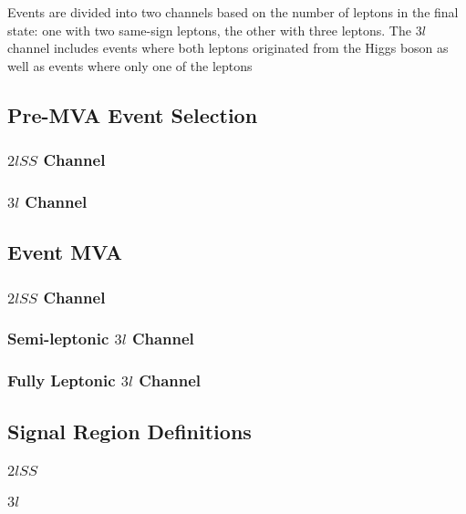 Events are divided into two channels based on the number of leptons in the final state: one with two same-sign leptons, the other with three leptons. The $3l$ channel includes events where both leptons originated from the Higgs boson as well as events where only one of the leptons 


\subsection{Pre-MVA Event Selection}
\label{subsec:preMVA}

\subsubsection{$2lSS$ Channel}

\subsubsection{$3l$ Channel}


\subsection{Event MVA}
\label{subsec:sigBkgMVA}

\subsubsection{$2lSS$ Channel}

\subsubsection{Semi-leptonic $3l$ Channel}

\subsubsection{Fully Leptonic $3l$ Channel}


\subsection{Signal Region Definitions}
\label{subsec:sigRegions}

\subsubsection{$2lSS$}

\subsubsection{$3l$}
